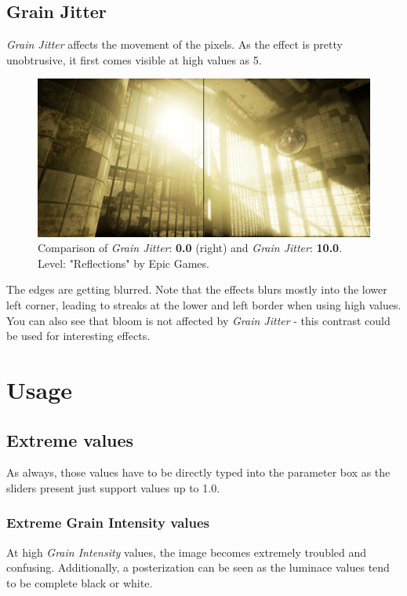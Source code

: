 \documentclass[A4]{article}
\begin{document}
	\subsection{Grain Jitter}
	\textit{Grain Jitter} affects the movement of the pixels. As the effect is pretty unobtrusive, it first comes visible at high values as 5.
	\begin{figure}
		\begin{center}
			\vspace{-20px}
			\includegraphics[scale=0.15]{JitterComparison.png}
			\vspace{-20px}
		\end{center}
		\caption{Comparison of \textit{Grain Jitter}: \textbf{0.0} (right) and \textit{Grain Jitter}: \textbf{10.0}. Level: "Reflections" by Epic Games.}
	\end{figure}
	The edges are getting blurred. Note that the effects blurs mostly into the lower left corner, leading to streaks at the lower and left border when using high values. You can also see that bloom is not affected by \textit{Grain Jitter} - this contrast could be used for interesting effects.
	
	\section{Usage}
	\subsection{Extreme values}
	As always, those values have to be directly typed into the parameter box as the sliders present just support values up to 1.0.
	
	\subsubsection{Extreme Grain Intensity values}
	At high \textit{Grain Intensity} values, the image becomes extremely troubled and confusing. Additionally, a posterization can be seen as the luminace values tend to be complete black or white.
	
\end{document}
